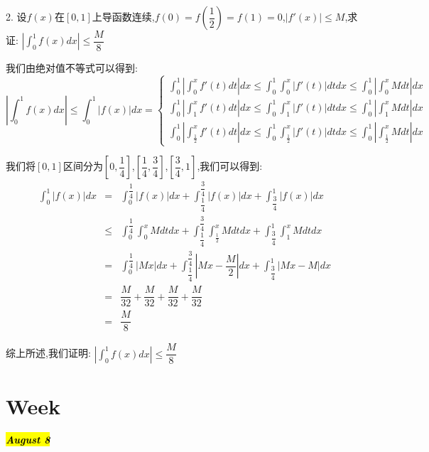 2. 设$f(x)$在$[0,1]$上导函数连续,$f(0)=f(\dfrac{1}{2})=f(1)=0$,$|f'(x)|\leq M$,求证:  $|\int_{0}^{1}f(x)dx|\leq \dfrac{M}{8}$
\begin{solution}

	我们由绝对值不等式可以得到:  
	$$|\int_{0}^{1}f(x)dx|\leq \int_{0}^{1}|f(x)|dx=\left\lbrace
	\begin{array}{l}
		\int_{0}^{1}|\int_{0}^{x}f'(t)dt|dx\leq \int_{0}^{1}\int_{0}^{x}|f'(t)|dtdx\leq \int_{0}^{1}|\int_{0}^{x}Mdt|dx\\
		\int_{0}^{1}|\int_{1}^{x}f'(t)dt|dx\leq \int_{0}^{1}\int_{1}^{x}|f'(t)|dtdx\leq \int_{0}^{1}|\int_{1}^{x}Mdt|dx\\
		\int_{0}^{1}|\int_{\frac{1}{2}}^{x}f'(t)dt|dx\leq \int_{0}^{1}\int_{\frac{1}{2}}^{x}|f'(t)|dtdx\leq \int_{0}^{1}|\int_{\frac{1}{2}}^{x}Mdt|dx
	\end{array}
	\right. $$
	
	我们将$[0,1]$区间分为$[0,\dfrac{1}{4}]$,$[\dfrac{1}{4},\dfrac{3}{4}]$,$[\dfrac{3}{4},1]$,我们可以得到:  
	\begin{eqnarray*}
		\int_{0}^{1}|f(x)|dx&=&\int_{0}^{\dfrac{1}{4}}|f(x)|dx+\int_{\dfrac{1}{4}}^{\dfrac{3}{4}}|f(x)|dx+\int_{\dfrac{3}{4}}^{1}|f(x)|dx\\
		&\leq&\int_{0}^{\dfrac{1}{4}}\int_{0}^{x}Mdtdx+\int_{\dfrac{1}{4}}^{\dfrac{3}{4}}\int_{\frac{1}{2}}^{x}Mdtdx+\int_{\dfrac{3}{4}}^{1}\int_{1}^{x}Mdtdx\\
		&=&\int_{0}^{\dfrac{1}{4}}|Mx|dx+\int_{\dfrac{1}{4}}^{\dfrac{3}{4}}|Mx-\dfrac{M}{2}|dx+\int_{\dfrac{3}{4}}^{1}|Mx-M|dx\\
		&=&\dfrac{M}{32}+\dfrac{M}{32}+\dfrac{M}{32}+\dfrac{M}{32}\\
		&=&\dfrac{M}{8}
	\end{eqnarray*}

	综上所述,我们证明:  $|\int_{0}^{1}f(x)dx|\leq \dfrac{M}{8}$
\end{solution}

\section{Week }
\hl{\textbf{\textit{August 8}}}

